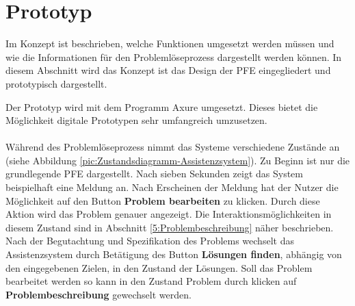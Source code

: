 \chapter{Prototyp}
\label{Prototyp}
Im Konzept ist beschrieben, welche Funktionen umgesetzt werden müssen und wie die Informationen für den Problemlöseprozess dargestellt werden können. In diesem Abschnitt wird das Konzept ist das Design der PFE eingegliedert und prototypisch dargestellt.

Der Prototyp wird mit dem Programm Axure  umgesetzt. Dieses bietet die Möglichkeit digitale Prototypen sehr umfangreich umzusetzen.
\\ \\
Während des Problemlöseprozess nimmt das Systeme verschiedene Zustände an (siehe Abbildung \ref{pic:Zustandsdiagramm-Assistenzsystem}). Zu Beginn ist nur die grundlegende PFE dargestellt. Nach sieben Sekunden zeigt das System beispielhaft eine Meldung an. Nach Erscheinen der Meldung hat der Nutzer die Möglichkeit auf den Button \textbf{Problem bearbeiten} zu klicken. Durch diese Aktion wird das Problem genauer angezeigt. Die Interaktionsmöglichkeiten in diesem Zustand sind in Abschnitt \ref{5:Problembeschreibung}  näher beschrieben. Nach der Begutachtung und Spezifikation des Problems wechselt das Assistenzsystem durch Betätigung des Button\textbf{ Lösungen finden}, abhängig von den eingegebenen Zielen, in den Zustand der Lösungen. Soll das Problem bearbeitet werden so kann in den Zustand Problem durch klicken auf \textbf{Problembeschreibung} gewechselt werden.

